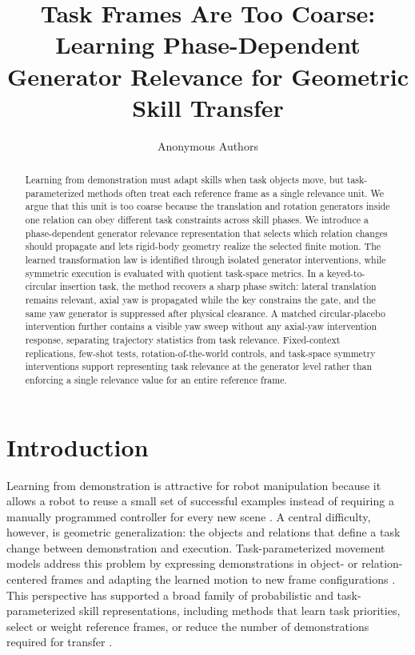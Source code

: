 \documentclass[letterpaper,10pt,conference]{ieeeconf}
\title{\LARGE \bf
Task Frames Are Too Coarse:
Learning Phase-Dependent Generator Relevance for Geometric Skill Transfer
}
\author{Anonymous Authors}
\begin{document}
\maketitle

\begin{abstract}
Learning from demonstration must adapt skills when task objects move, but
task-parameterized methods often treat each reference frame as a single
relevance unit. We argue that this unit is too coarse because the translation
and rotation generators inside one relation can obey different task constraints
across skill phases. We introduce a phase-dependent generator relevance
representation that selects which relation changes should propagate and lets
rigid-body geometry realize the selected finite motion. The learned
transformation law is identified through isolated generator interventions, while
symmetric execution is evaluated with quotient task-space metrics. In a
keyed-to-circular insertion task, the method recovers a sharp phase switch:
lateral translation remains relevant, axial yaw is propagated while the key
constrains the gate, and the same yaw generator is suppressed after physical
clearance. A matched circular-placebo intervention further contains a visible
yaw sweep without any axial-yaw intervention response, separating trajectory
statistics from task relevance. Fixed-context replications, few-shot tests,
rotation-of-the-world controls, and task-space symmetry interventions support
representing task relevance at the generator level rather than enforcing a
single relevance value for an entire reference frame.
\end{abstract}

\section{Introduction}
\label{sec:intro}

Learning from demonstration is attractive for robot manipulation because it
allows a robot to reuse a small set of successful examples instead of requiring
a manually programmed controller for every new scene
\cite{Argall2009Survey,Ravichandar2020Recent}. A central difficulty,
however, is geometric generalization: the objects and relations that define a
task change between demonstration and execution. Task-parameterized movement
models address this problem by expressing demonstrations in object- or
relation-centered frames and adapting the learned motion to new frame
configurations \cite{Calinon2016Tutorial,Calinon2014TPGMM,Calinon2018TPModels}.
This perspective has supported a broad family of probabilistic and
task-parameterized skill representations, including methods that learn task
priorities, select or weight reference frames, or reduce the number of
demonstrations required for transfer
\cite{Huang2018GeneralizedTP,Silverio2019TaskPriorities,Sena2019FrameWeighted,
Zhu2022FewTP,Sun2024FrameWeighted,Montero2024TPGP}.
\end{document}
